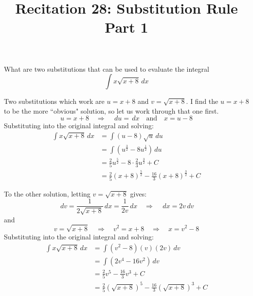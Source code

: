 \documentclass[nooutcomes, handout]{ximera}
\title{Recitation 28: Substitution Rule Part 1}
\renewcommand{\d}{\,d}
\begin{document}
\begin{abstract}		\end{abstract}
\maketitle

\begin{problem}[warmup]
  What are two substitutions that can be used to evaluate the integral
  \begin{equation*}
    \int x \sqrt{x+8} \d x
  \end{equation*}
	
		\begin{freeResponse}
                  Two substitutions which work are $u=x+8$ and
                  $v=\sqrt{x+8}$.  I find the $u=x+8$ to be the more
                  ``obvious" solution, so let us work through that one
                  first.
                  \begin{equation*}
                    u=x+8 \quad \Longrightarrow \quad \d u = \d x \quad \text{and} \quad x = u-8
                  \end{equation*}
                  Substituting into the original integral and solving:
                  \begin{align*}
                    \int x \sqrt{x+8} \d x &= \int (u-8) \sqrt{u} \d u  \\
                                           &= \int (u^{\frac{3}{2}} - 8u^{\frac{1}{2}} ) \d u  \\
                                           &= \frac{2}{5} u^{\frac{5}{2}} - 8 \cdot \frac{2}{3} u^{\frac{3}{2}} + C  \\
                                           &= \frac{2}{5} (x+8)^{\frac{5}{2}} - \frac{16}{3} (x+8)^{\frac{3}{2}} + C
                  \end{align*}
		
                  To the other solution, letting $v=\sqrt{x+8}$ gives:
                  \begin{equation*}
                    \d v = \frac{1}{2 \sqrt{x+8}} \d x = \frac{1}{2v} \d x 	\quad	\Longrightarrow \quad \d x = 2v \d v
                  \end{equation*}
                  and
                  \begin{equation*}
                    v = \sqrt{x+8} \quad \Longrightarrow \quad v^2 = x+8 \quad \Longrightarrow \quad x= v^2-8
                  \end{equation*}
                  Substituting into the original integral and solving:
                  \begin{align*}
                    \int x \sqrt{x+8} \d x &= \int (v^2-8)(v)(2v)\d v  \\
                                           &= \int (2v^4 - 16v^2) \d v  \\
                                           &= \frac{2}{5} v^5 - \frac{16}{3} v^3 + C  \\
                                           &= \frac{2}{5} (\sqrt{x+8})^5 - \frac{16}{3} (\sqrt{x+8})^3 + C
                  \end{align*}
		

\end{freeResponse}
\end{problem}
\end{document}
